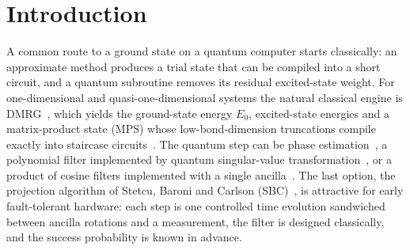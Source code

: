 \documentclass[aps,pra,twocolumn,superscriptaddress,nofootinbib]{revtex4-2}
\begin{document}
\maketitle

\section{Introduction}

A common route to a ground state on a quantum computer starts classically: an approximate method
produces a trial state that can be compiled into a short circuit, and a quantum subroutine removes its
residual excited-state weight. For one-dimensional and quasi-one-dimensional systems the natural
classical engine is DMRG~\cite{White1992,Schollwock2011}, which yields the ground-state energy $E_0$,
excited-state energies and a matrix-product state (MPS) whose low-bond-dimension truncations compile
exactly into staircase circuits~\cite{Ran2020}. The quantum step can be phase estimation~\cite{Ge2019},
a polynomial filter implemented by quantum singular-value
transformation~\cite{Lin2020,Gilyen2019,Dong2022}, or a product of cosine filters implemented with a
single ancilla~\cite{Stetcu2023,Choi2021}. The last option, the projection algorithm of Stetcu, Baroni
and Carlson (SBC)~\cite{Stetcu2023}, is attractive for early fault-tolerant hardware: each step is one
controlled time evolution sandwiched between ancilla rotations and a measurement, the filter is
designed classically, and the success probability is known in advance.
\end{document}

